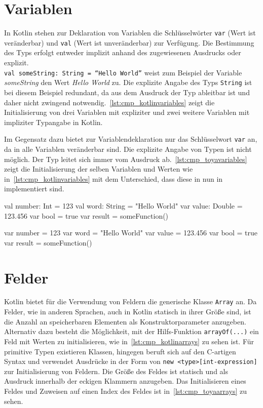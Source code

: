 \section{Variablen}

In Kotlin stehen zur Deklaration von Variablen die Schlüsselwörter \texttt{var} (Wert ist veränderbar) und \texttt{val} (Wert ist unveränderbar) zur Verfügung. Die Bestimmung des Typs erfolgt entweder implizit anhand des zugewiesenen Ausdrucks oder explizit.\\ \texttt{val someString: String = ``Hello World''} weist zum Beispiel der Variable \textit{someString} den Wert \textit{Hello World} zu. Die explizite Angabe des Typs \texttt{String} ist bei diesem Beispiel redundant, da aus dem Ausdruck der Typ ableitbar ist und daher nicht zwingend notwendig.~\autoref{lst:cmp_kotlinvariables} zeigt die Initialisierung von drei Variablen mit expliziter und zwei weitere Variablen mit impliziter Typangabe in Kotlin.

Im Gegensatz dazu bietet \toya zur Variablendeklaration nur das Schlüsselwort \texttt{var} an, da in \toya alle Variablen veränderbar sind. Die explizite Angabe von Typen ist nicht möglich. Der Typ leitet sich immer vom Ausdruck ab.~\autoref{lst:cmp_toyavariables} zeigt die Initialisierung der selben Variablen und Werten wie in~\autoref{lst:cmp_kotlinvariables} mit dem Unterschied, dass diese in nun in \toya implementiert sind.

\begin{KotlinCode}[numbers=none, caption={Variablendeklarationen in Kotlin}, label=lst:cmp_kotlinvariables]
val number: Int = 123
val word: String = "Hello World"
var value: Double = 123.456
var bool = true
var result = someFunction()
\end{KotlinCode}

\begin{ToyaCode}[numbers=none, caption={Variablendeklarationen in \toya}, label=lst:cmp_toyavariables]
var number = 123
var word = "Hello World"
var value = 123.456
var bool = true
var result = someFunction()
\end{ToyaCode}

\section{Felder}

Kotlin bietet für die Verwendung von Feldern die generische Klasse \texttt{Array} an. Da Felder, wie in anderen Sprachen, auch in Kotlin statisch in ihrer Größe sind, ist die Anzahl an speicherbaren Elementen als Konstruktorparameter anzugeben. Alternativ dazu besteht die Möglichkeit, mit der Hilfs-Funktion \texttt{arrayOf(...)} ein Feld mit Werten zu initialisieren, wie in~\autoref{lst:cmp_kotlinarrays} zu sehen ist. Für primitive Typen existieren Klassen, \toya hingegen beruft sich auf den C-artigen Syntax und verwendet Ausdrücke in der Form von \texttt{new <type>[int-expression]} zur Initialisierung von Feldern. Die Größe des Feldes ist statisch und als Ausdruck innerhalb der eckigen Klammern anzugeben. Das Initialisieren eines Feldes und Zuweisen auf einen Index des Feldes ist in~\autoref{lst:cmp_toyaarrays} zu sehen.

